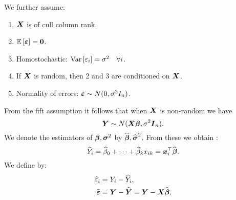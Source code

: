 We further assume:
\begin{enumerate}
    \item $\X$ is of cull column rank.
    \item $\ev{\E}=\zero$.
    \item Homostochastic: $\var{\e_i} = \s^2 \quad\forall i$.
    \item If $\X$ is random, then 2 and 3 are conditioned on $\X$. 
    \item Normality of errors: $\E\sim N(0, \s^2I_n)$.
\end{enumerate}
From the fift assumption it follows that when $\X$ is non-random we have
$$
    \Y \sim N(\X\B, \s^2 \mI_n).
$$
We denote the estimators of $\B, \S^2$ by $\Bh, \Sh^2$. From these we obtain :
$$
    \hat{Y}_i = \bh_0 + \cdots + \bh_k x_{ik} = \x_i^\top\Bh.
$$
We define  by:
\begin{align*}
    \eh_i &= Y_i-\hat{Y}_i, \\
    \Eh &= \Y-\hat{\Y} = \Y-\X\Bh.
\end{align*}

